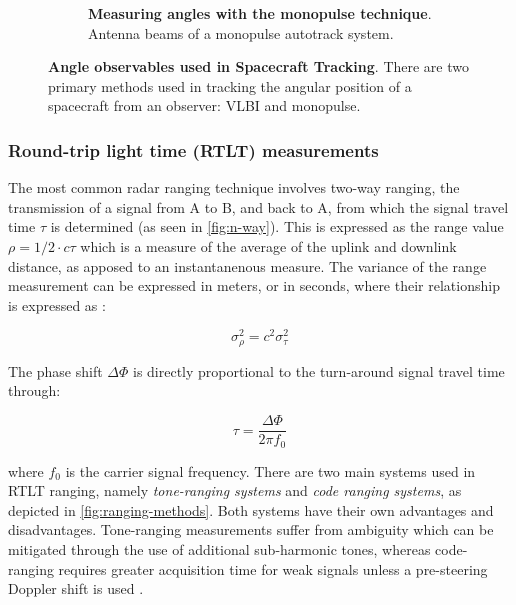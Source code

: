 \begin{figure}
\begin{subfigure}{.48\textwidth}
        \caption{
            \textbf{Measuring angles with the monopulse technique}. Antenna beams of a
            monopulse autotrack system.~\cite[p.~196]{Montenbruck2000}
        }
        \label{fig:vlbi}
    \end{subfigure}
    \caption{\textbf{Angle observables used in Spacecraft Tracking}. There are two primary methods used in tracking the angular position of a spacecraft from an observer: \gls{VLBI} and monopulse.}
    \label{fig:test}
\end{figure}


\subsubsection{Round-trip light time (RTLT) measurements}

The most common radar ranging technique involves two-way ranging, the
transmission of a signal from A to B, and back to A, from which the signal
travel time $\tau$ is determined (as seen in \autoref{fig:n-way}). This is
expressed as the range value $\rho=1/2\cdot{}c\tau$ which is a measure of the
average of the uplink and downlink distance, as apposed to an instantanenous
measure. The variance of the range measurement can be expressed in meters, or in
seconds, where their relationship is expressed as \cite{Berner2002}:

\begin{equation}
    \sigma_{\rho}^2 = c^2\sigma_{\tau}^2
\end{equation}

The phase shift $\Delta\Phi$ is directly proportional to the
turn-around signal travel time through:

\begin{equation}
    \tau = \frac{\Delta\Phi}{2\pi{}f_0}
\end{equation}

where $f_0$ is the carrier signal frequency. There are two main systems used in
RTLT ranging, namely \textit{tone-ranging systems} and \textit{code ranging
    systems}, as depicted in \autoref{fig:ranging-methods}. Both systems have their
own advantages and disadvantages. Tone-ranging measurements suffer from
ambiguity which can be mitigated through the use of additional sub-harmonic
tones, whereas code-ranging requires greater acquisition time for weak signals
unless a pre-steering Doppler shift is used \cite[p.~197]{Montenbruck2000}.

